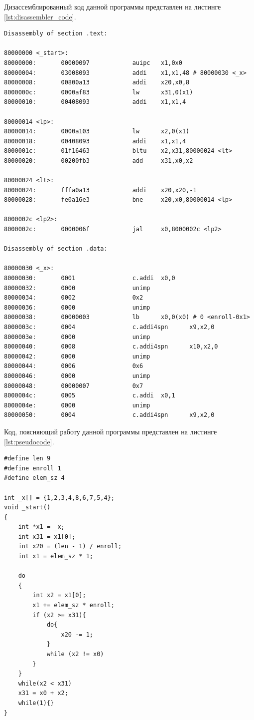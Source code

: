 Дизассемблированный код данной программы представлен на листинге \ref{lst:disassembler_code}.
\begin{lstlisting}[label=lst:disassembler_code,caption=Дизассемблированный код]
Disassembly of section .text:

80000000 <_start>:
80000000:       00000097            auipc   x1,0x0
80000004:       03008093            addi    x1,x1,48 # 80000030 <_x>
80000008:       00800a13            addi    x20,x0,8
8000000c:       0000af83            lw      x31,0(x1)
80000010:       00408093            addi    x1,x1,4

80000014 <lp>:
80000014:       0000a103            lw      x2,0(x1)
80000018:       00408093            addi    x1,x1,4
8000001c:       01f16463            bltu    x2,x31,80000024 <lt>
80000020:       00200fb3            add     x31,x0,x2

80000024 <lt>:
80000024:       fffa0a13            addi    x20,x20,-1
80000028:       fe0a16e3            bne     x20,x0,80000014 <lp>

8000002c <lp2>:
8000002c:       0000006f            jal     x0,8000002c <lp2>

Disassembly of section .data:

80000030 <_x>:
80000030:       0001                c.addi  x0,0
80000032:       0000                unimp
80000034:       0002                0x2
80000036:       0000                unimp
80000038:       00000003            lb      x0,0(x0) # 0 <enroll-0x1>
8000003c:       0004                c.addi4spn      x9,x2,0
8000003e:       0000                unimp
80000040:       0008                c.addi4spn      x10,x2,0
80000042:       0000                unimp
80000044:       0006                0x6
80000046:       0000                unimp
80000048:       00000007            0x7
8000004c:       0005                c.addi  x0,1
8000004e:       0000                unimp
80000050:       0004                c.addi4spn      x9,x2,0
\end{lstlisting}

Код, поясняющий работу данной программы представлен на листинге \ref{lst:pseudocode}.
\begin{lstlisting}[label=lst:pseudocode, caption=Дизассемблированный код]
#define len 9
#define enroll 1
#define elem_sz 4

int _x[] = {1,2,3,4,8,6,7,5,4};
void _start()
{
	int *x1 = _x;
	int x31 = x1[0];
	int x20 = (len - 1) / enroll;
	int x1 = elem_sz * 1;
	
	do
	{
		int x2 = x1[0];
		x1 += elem_sz * enroll;
		if (x2 >= x31){
			do{
				x20 -= 1;
			}
			while (x2 != x0)
		}
	}
	while(x2 < x31)
	x31 = x0 + x2;
	while(1){}
}
\end{lstlisting}

